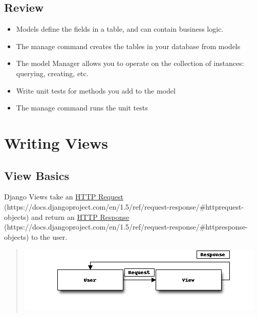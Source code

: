 \documentclass[letterpaper,10pt,english]{sphinxmanual}
\begin{document}
\section{Review}
\label{tutorial/models:review}\begin{itemize}
\item {} 
Models define the fields in a table, and can contain business logic.

\item {} 
The  manage command creates the tables in your database from
models

\item {} 
The model Manager allows you to operate on the collection of
instances: querying, creating, etc.

\item {} 
Write unit tests for methods you add to the model

\item {} 
The  manage command runs the unit tests

\end{itemize}


\chapter{Writing Views}
\label{tutorial/views:writing-views}\label{tutorial/views::doc}\label{tutorial/views:model-meta}

\section{View Basics}
\label{tutorial/views:view-basics}
Django Views take an \href{https://docs.djangoproject.com/en/1.5/ref/request-response/\#httprequest-objects}{HTTP Request} (https://docs.djangoproject.com/en/1.5/ref/request-response/\#httprequest-objects) and return an \href{https://docs.djangoproject.com/en/1.5/ref/request-response/\#httpresponse-objects}{HTTP Response} (https://docs.djangoproject.com/en/1.5/ref/request-response/\#httpresponse-objects) to
the user.
\begin{quote}
\par\includegraphics{blockdiag-73065eaf0b801e69ef10fe246919a0006f946ae2.png}\par\end{quote}
\end{document}
